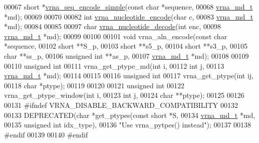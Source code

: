 \begin{DoxyCode}
00067 \textcolor{keywordtype}{short} *\hyperlink{group__alphabet__utils_ga3cd79d21d53248ad2634c1c0d43e97d7}{vrna\_seq\_encode\_simple}(\textcolor{keyword}{const} \textcolor{keywordtype}{char}  *sequence,
00068                               \hyperlink{group__model__details_structvrna__md__s}{vrna\_md\_t}   *md);
00069 
00070 
00082 \textcolor{keywordtype}{int} \hyperlink{group__alphabet__utils_gac12bf00123f88621c9be847b0879c1fb}{vrna\_nucleotide\_encode}(\textcolor{keywordtype}{char}       c,
00083                            \hyperlink{group__model__details_structvrna__md__s}{vrna\_md\_t}  *md);
00084 
00085 
00097 \textcolor{keywordtype}{char} \hyperlink{group__alphabet__utils_ga48ef585e697be9c8a08ed68c655e29b6}{vrna\_nucleotide\_decode}(\textcolor{keywordtype}{int}       enc,
00098                             \hyperlink{group__model__details_structvrna__md__s}{vrna\_md\_t} *md);
00099 
00100 
00101 \textcolor{keywordtype}{void} vrna\_aln\_encode(\textcolor{keyword}{const} \textcolor{keywordtype}{char}   *sequence,
00102                      \textcolor{keywordtype}{short}        **S\_p,
00103                      \textcolor{keywordtype}{short}        **s5\_p,
00104                      \textcolor{keywordtype}{short}        **s3\_p,
00105                      \textcolor{keywordtype}{char}         **ss\_p,
00106                      \textcolor{keywordtype}{unsigned} \textcolor{keywordtype}{int} **as\_p,
00107                      \hyperlink{group__model__details_structvrna__md__s}{vrna\_md\_t}    *md);
00108 
00109 
00110 \textcolor{keywordtype}{unsigned} \textcolor{keywordtype}{int}
00111 vrna\_get\_ptype\_md(\textcolor{keywordtype}{int}       i,
00112                   \textcolor{keywordtype}{int}       j,
00113                   \hyperlink{group__model__details_structvrna__md__s}{vrna\_md\_t} *md);
00114 
00115 
00116 \textcolor{keywordtype}{unsigned} \textcolor{keywordtype}{int}
00117 vrna\_get\_ptype(\textcolor{keywordtype}{int}  ij,
00118                \textcolor{keywordtype}{char} *ptype);
00119 
00120 
00121 \textcolor{keywordtype}{unsigned} \textcolor{keywordtype}{int}
00122 vrna\_get\_ptype\_window(\textcolor{keywordtype}{int}   i,
00123                       \textcolor{keywordtype}{int}   j,
00124                       \textcolor{keywordtype}{char}  **ptype);
00125 
00126 
00131 \textcolor{preprocessor}{#ifndef VRNA\_DISABLE\_BACKWARD\_COMPATIBILITY}
00132 
00133 DEPRECATED(\textcolor{keywordtype}{char} *get\_ptypes(\textcolor{keyword}{const} \textcolor{keywordtype}{short}   *S,
00134                             \hyperlink{group__model__details_structvrna__md__s}{vrna\_md\_t}     *md,
00135                             \textcolor{keywordtype}{unsigned} \textcolor{keywordtype}{int}  idx\_type),
00136           \textcolor{stringliteral}{"Use vrna\_pytpes() instead"});
00137 
00138 \textcolor{preprocessor}{#endif}
00139 
00140 \textcolor{preprocessor}{#endif}
\end{DoxyCode}
